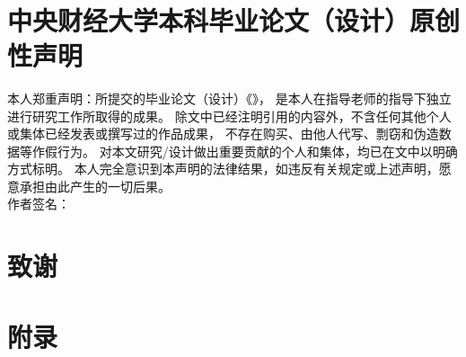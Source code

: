 \documentclass[a4paper,12pt]{report}
\begin{document}
\thispagestyle{plain}
\setcounter{page}{1}
\begin{spacing}{1.8333} %
\tableofcontents %
\end{spacing}
\newpage
\begin{center}
    \textbf{}
    \\[12pt]
\end{center}
\thispagestyle{plain}
\setcounter{page}{1}





\printbibliography
{}
\newpage
\chapter*{中央财经大学本科毕业论文（设计）原创性声明}
\vspace{1mm}
本人郑重声明：所提交的毕业论文（设计）《\MYTITLE》，
是本人在指导老师的指导下独立进行研究工作所取得的成果。
除文中已经注明引用的内容外，不含任何其他个人或集体已经发表或撰写过的作品成果，
不存在购买、由他人代写、剽窃和伪造数据等作假行为。
对本文研究/设计做出重要贡献的个人和集体，均已在文中以明确方式标明。
本人完全意识到本声明的法律结果，如违反有关规定或上述声明，愿意承担由此产生的一切后果。
\\[50pt]
作者签名：\\
\newpage
\chapter*{致谢}

\newpage
\chapter*{附录}
\end{document}
